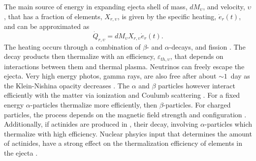 
The main source of energy in expanding ejecta shell of mass, $dM_{\upsilon}$,
and velocity, $\upsilon$, that has a fraction of \rproc{} elements, $X_{r,\upsilon}$, 
is given by the specific heating, $\dot{e}_r(t)$, and can be approximated as 
%
\begin{equation}
\dot{Q}_{r,\upsilon} = dM_{\upsilon}X_{r,\upsilon}\dot{e}_{r}(t).
\end{equation}
%
The heating occurs through a combination of $\beta$- and $\alpha$-decays, 
and fission \citep{Metzger:2010,Barnes:2016umi,Hotokezaka:2017dbk}. 
The decay products then thermalize with an efficiency, $\varepsilon_{th,\upsilon}$, 
that depends on interactions between them and thermal plasma. 
Neutrinos can freely escape the ejecta. Very high energy photos, gamma rays, 
are also free after about ${\sim}1$~day as the Klein-Nishina opacity decreases 
\citep{Hotokezaka:2017dbk,Barnes:2016umi}.
%
The $\alpha$ and $\beta$ particles however interact efficiently with the matter via 
ionization \citep{Barnes:2016umi} and Coulumb scattering \citep{Metzger:2010}.
For a fixed energy $\alpha$-particles thermalize more efficiently, then 
$\beta$-particles. For charged particles, the process depends on the magnetic 
field strength and configuration \citep{Barnes:2016umi}. 
%
Additionally, if actinides are produced in \rproc{}, their decay, 
involving $\alpha$-particles which thermalize with high efficiency. 
Nuclear phsyics input that determines the amount of actinides, 
have a strong effect on the thermalization efficiency of \rproc{} elements in the ejecta
\citep{Barnes:2020nfi}.
%
